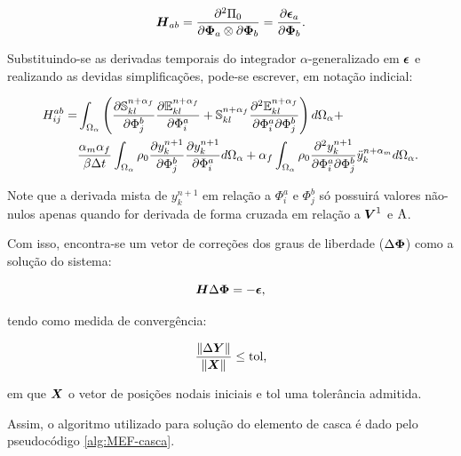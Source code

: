 \begin{equation}
    \boldsymbol{H}_{ab}=\frac{\partial^2\Pi_0}{\partial\boldsymbol{\Phi}_a\otimes\partial\boldsymbol{\Phi}_b}=\frac{\partial{\boldsymbol{\epsilon}_a}}{\partial{\boldsymbol{\Phi}_b}}\text{.}
\end{equation}

Substituindo-se as derivadas temporais do integrador $\alpha$-generalizado em $\boldsymbol{\epsilon}$ e realizando as devidas simplificações, pode-se escrever, em notação indicial:

\begin{equation}
    \begin{split}
        H_{ij}^{ab}=&\int_{\Omega_\alpha}{\left({\frac{\partial{\boldsymbol{\mathbb{S}}^{n+\alpha_f}_{kl}}}{\partial{\Phi_j^b}}\frac{\partial{\mathbb{E}^{n+\alpha_f}_{kl}}}{\partial{\Phi_i^a}}+\boldsymbol{\mathbb{S}}^{n+\alpha_f}_{kl}\frac{\partial^2{\mathbb{E}^{n+\alpha_f}_{kl}}}{\partial{\Phi_i^a}\partial{\Phi_j^b}}}\right) d\Omega_\alpha}+\\
        &\frac{\alpha_m\alpha_f}{\beta\Delta t}\int_{\Omega_\alpha}{\rho_0\frac{\partial{y_k^{n+1}}}{\partial{\Phi_j^b}}\frac{\partial{y_k^{n+1}}}{\partial{\Phi_i^a}} d\Omega_\alpha}+\alpha_f\int_{\Omega_\alpha}{\rho_0\frac{\partial^2{y_k^{n+1}}}{\partial{\Phi_i^a}\partial{\Phi_j^b}}\ddot{y}_k^{n+\alpha_m} d\Omega_\alpha}\text{.}
    \end{split}
    \label{eq:CSD-Hijab}
\end{equation}

%

Note que a derivada mista de $y_k^{n+1}$ em relação a $\Phi_i^a$ e $\Phi_j^b$ só possuirá valores não-nulos apenas quando for derivada de forma cruzada em relação a $\boldsymbol{V}^1$ e $\mathrm{A}$.

Com isso, encontra-se um vetor de correções dos graus de liberdade ($\Delta\boldsymbol{\Phi}$) como a solução do sistema:

\begin{equation}
    \boldsymbol{H}\Delta\boldsymbol{\Phi}=-\boldsymbol{\epsilon}\text{,}
\end{equation}

\noindent tendo como medida de convergência:

\begin{equation}
    \frac{\left\lVert{\Delta\boldsymbol{Y}}\right\lVert}{\left\lVert{\boldsymbol{X}}\right\lVert}\leq\text{tol,}
    \label{eq:CSD-erro}
\end{equation}

\noindent em que $\boldsymbol{X}$ o vetor de posições nodais iniciais e tol uma tolerância admitida.

Assim, o algoritmo utilizado para solução do elemento de casca é dado pelo pseudocódigo \ref{alg:MEF-casca}.

